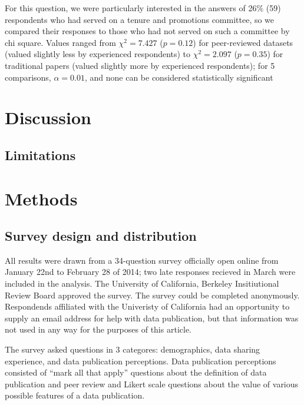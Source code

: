 \documentclass[10pt]{article}
\begin{document}
For this question, we were particularly interested in the answers of 26\% (59) respondents who had served on a tenure and promotions committee, so we compared their responses to those who had not served on such a committee by chi square.
Values ranged from $\chi^{2}= 7.427$ ($p= 0.12$) for peer-reviewed datasets (valued slightly less by experienced respondents) to $\chi^{2}= 2.097$ ($p= 0.35$) for traditional papers (valued slightly more by experienced respondents); for 5 comparisons, $\alpha=0.01$, and none can be considered statistically significant


\section*{Discussion}

\subsection*{Limitations}





\section*{Methods}
\subsection*{Survey design and distribution}
All results were drawn from a 34-question survey officially open online from January 22nd to February 28 of 2014; two late responses recieved in March were included in the analysis.
The University of California, Berkeley Insitiutional Review Board approved the survey.
The survey could be completed anonymously.
Respondends affiliated with the Univeristy of California had an opportunity to supply an email address for help with data publication, but that information was not used in any way for the purposes of this article.

The survey asked questions in 3 categores: demographics, data sharing experience, and data publication perceptions.
Data publication perceptions consisted of ``mark all that apply'' questions about the definition of data publication and peer review and Likert scale questions about the value of various possible features of a data publication.
\end{document}
